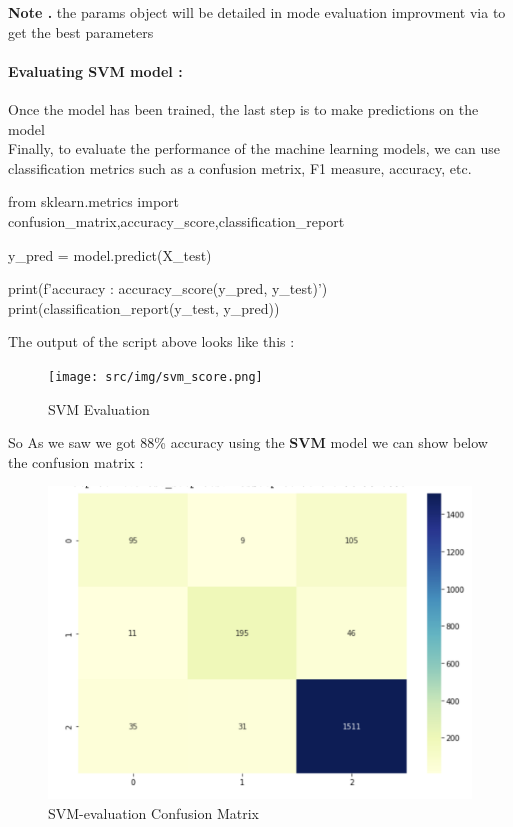 \documentclass{article}
\begin{document}
\textbf{Note .} the params object will be detailed in mode evaluation improvment via  to get the best parameters

\paragraph{ Evaluating SVM model :}
Once the model has been trained, the last step is to make predictions on the model \\
Finally, to evaluate the performance of the machine learning models, we can use classification metrics such as a confusion metrix, F1 measure, accuracy, etc.
\begin{code}
from sklearn.metrics import confusion_matrix,accuracy_score,classification_report

y_pred = model.predict(X_test)

print(f'accuracy : {accuracy_score(y_pred, y_test)}')
print(classification_report(y_test, y_pred))

\end{code}
The output of the script above looks like this :
\begin{figure}[H]
    \centering
    \texttt{[image: src/img/svm\_score.png]}
    \caption{SVM Evaluation}
    \label{fig:my_label}
\end{figure}
So As we saw we got 88\% accuracy using the \textbf{SVM} model we can show below the confusion matrix :
\begin{figure}[H]
    \centering
    \includegraphics[scale=0.4]{src/img/svm_cm.png}
    \caption{SVM-evaluation Confusion Matrix}
    \label{fig:my_label}
\end{figure}
\end{document}
